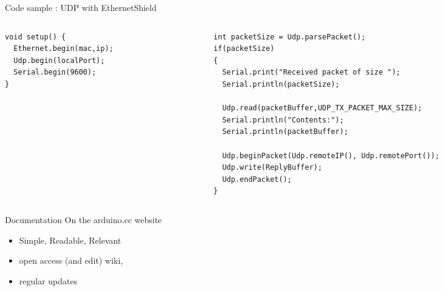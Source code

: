 \begin{frame}[containsverbatim]{Code sample : UDP with EthernetShield }
	\begin{columns}[c]
		\begin{column}[c]{.4\textwidth}

\begin{Verbatim}[fontsize=\scriptsize]
void setup() {
  Ethernet.begin(mac,ip);
  Udp.begin(localPort);
  Serial.begin(9600);
}
\end{Verbatim}

		\end{column}
		\begin{column}[c]{.8\textwidth}

\begin{Verbatim}[fontsize=\scriptsize]
int packetSize = Udp.parsePacket();
if(packetSize)
{
  Serial.print("Received packet of size ");
  Serial.println(packetSize);

  Udp.read(packetBuffer,UDP_TX_PACKET_MAX_SIZE);
  Serial.println("Contents:");
  Serial.println(packetBuffer);

  Udp.beginPacket(Udp.remoteIP(), Udp.remotePort());
  Udp.write(ReplyBuffer);
  Udp.endPacket();
}
\end{Verbatim}

		\end{column}
	\end{columns}
\end{frame}



\begin{frame}{Documentation}
	On the arduino.cc website
	\begin{itemize}
		\item Simple, Readable, Relevant 
		\item open access (and edit) wiki, 
		\item regular updates
	\end{itemize}
\end{frame}

